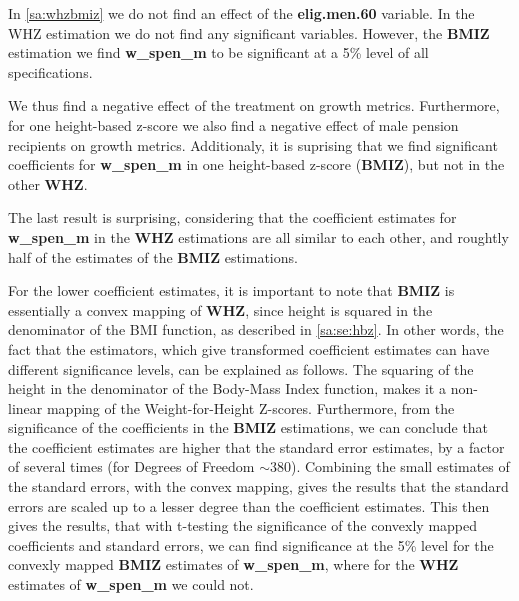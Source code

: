 \begin{refsection}
In \autoref{sa:whzbmiz} we do not find an effect of the \textbf{elig.men.60} variable.
In the WHZ estimation we do not find any significant variables.
However, the \textbf{BMIZ} estimation we find \textbf{w\_spen\_m} to be significant at a 5\% level of all specifications.

We thus find a negative effect of the treatment on growth metrics.
Furthermore, for one height-based z-score we also find a negative effect of male pension recipients on growth metrics.
Additionaly, it is suprising that we find significant coefficients for \textbf{w\_spen\_m} in one height-based z-score (\textbf{BMIZ}), but not in the other \textbf{WHZ}.

The last result is surprising,
considering that the coefficient estimates for \textbf{w\_spen\_m} in the \textbf{WHZ} estimations are all similar to each other,
and roughtly half of the estimates of the \textbf{BMIZ} estimations.

For the lower coefficient estimates, it is important to note that \textbf{BMIZ} is essentially a convex mapping of \textbf{WHZ},
since height is squared in the denominator of the BMI function, as described in \autoref{sa:se:hbz}.
In other words, the fact that the estimators, which give transformed coefficient estimates can have different significance levels,
can be explained as follows.
The squaring of the height in the denominator of the Body-Mass Index function, makes it a non-linear mapping of the Weight-for-Height Z-scores.
Furthermore, from the significance of the coefficients in the \textbf{BMIZ} estimations,
we can conclude that the coefficient estimates are higher that the standard error estimates,
by a factor of several times (for Degrees of Freedom $\sim 380$).
Combining the small estimates of the standard errors, with the convex mapping,
gives the results that the standard errors are scaled up to a lesser degree than the coefficient estimates.
This then gives the results, that with t-testing the significance of the convexly mapped coefficients and standard errors,
we can find significance at the 5\% level for the convexly mapped \textbf{BMIZ} estimates of \textbf{w\_spen\_m},
where for the \textbf{WHZ} estimates of \textbf{w\_spen\_m} we could not.


\end{refsection}
